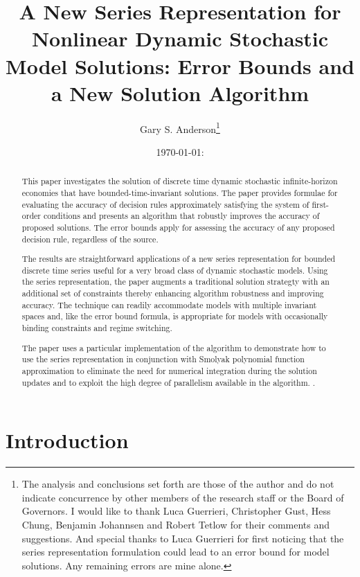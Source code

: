 \documentclass[12pt]{article}
\author{Gary S. Anderson\thanks{The analysis and conclusions set forth are those of the author and do not indicate concurrence by other members of the research staff or the Board of Governors. I would like to thank Luca Guerrieri, Christopher Gust, Hess Chung, Benjamin Johannsen  and Robert Tetlow for their comments and suggestions.  And special thanks to Luca Guerrieri for first noticing that the series representation formulation could lead to an error bound for model solutions. Any remaining errors are mine alone.}}
\title{A New Series Representation for 
  Nonlinear Dynamic Stochastic Model Solutions: 
  Error Bounds and a New Solution Algorithm} %
\date{\today: \currenttime}
\begin{document}



\maketitle

\begin{abstract}
This paper investigates the solution of discrete time  dynamic stochastic
infinite-horizon economies that have bounded-time-invariant solutions.
The paper provides formulae for evaluating the accuracy of decision rules
approximately satisfying the system of first-order conditions and presents
an algorithm that robustly improves the accuracy of proposed solutions.
The error bounds apply for assessing the accuracy of any proposed decision rule, regardless of the source.

The results are straightforward applications of a  new series representation
for bounded discrete time series useful for
a very broad class of dynamic stochastic models.
Using the series representation, the paper 
augments a traditional solution strategty with an additional set of
constraints thereby
enhancing algorithm robustness and improving accuracy.
The technique can readily accommodate models with multiple invariant spaces
and, like the error bound formula,  is appropriate
for models with occasionally binding constraints and regime switching. 





The  paper uses a particular implementation of the algorithm to
demonstrate how to use the 
series representation in conjunction with 
Smolyak polynomial function approximation  
to eliminate the need for numerical integration during the solution updates and to exploit the high degree of parallelism available in the algorithm.
.







\end{abstract}

\newpage
\tableofcontents
\newpage

\section{Introduction}
\end{document}
